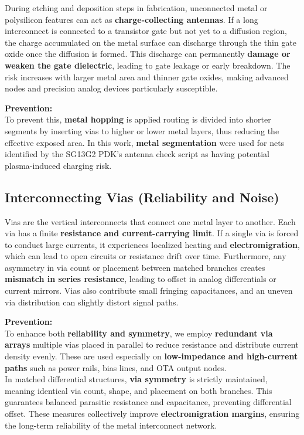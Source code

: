 \documentclass[
  11pt,
  a4paper,
  oneside]{scrbook}
\begin{document}
During etching and deposition steps in fabrication, unconnected metal or
polysilicon features can act as \textbf{charge-collecting antennas}. If
a long interconnect is connected to a transistor gate but not yet to a
diffusion region, the charge accumulated on the metal surface can
discharge through the thin gate oxide once the diffusion is formed. This
discharge can permanently \textbf{damage or weaken the gate dielectric},
leading to gate leakage or early breakdown. The risk increases with
larger metal area and thinner gate oxides, making advanced nodes and
precision analog devices particularly susceptible.

\textbf{Prevention:}\\
To prevent this, \textbf{metal hopping} is applied routing is divided
into shorter segments by inserting vias to higher or lower metal layers,
thus reducing the effective exposed area. In this work, \textbf{metal
segmentation} were used for nets identified by the SG13G2 PDK's antenna
check script as having potential plasma-induced charging risk.

\subsection{Interconnecting Vias (Reliability and
Noise)}\label{interconnecting-vias-reliability-and-noise}

Vias are the vertical interconnects that connect one metal layer to
another. Each via has a finite \textbf{resistance and current-carrying
limit}. If a single via is forced to conduct large currents, it
experiences localized heating and \textbf{electromigration}, which can
lead to open circuits or resistance drift over time. Furthermore, any
asymmetry in via count or placement between matched branches creates
\textbf{mismatch in series resistance}, leading to offset in analog
differentials or current mirrors. Vias also contribute small fringing
capacitances, and an uneven via distribution can slightly distort signal
paths.

\textbf{Prevention:}\\
To enhance both \textbf{reliability and symmetry}, we employ
\textbf{redundant via arrays} multiple vias placed in parallel to reduce
resistance and distribute current density evenly. These are used
especially on \textbf{low-impedance and high-current paths} such as
power rails, bias lines, and OTA output nodes.\\
In matched differential structures, \textbf{via symmetry} is strictly
maintained, meaning identical via count, shape, and placement on both
branches. This guarantees balanced parasitic resistance and capacitance,
preventing differential offset. These measures collectively improve
\textbf{electromigration margins}, ensuring the long-term reliability of
the metal interconnect network.
\end{document}
